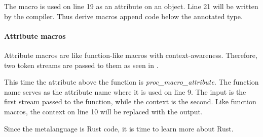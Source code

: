 The macro is used on line 19 as an attribute on an object.
Line 21 will be written by the compiler.
Thus derive macros append code below the annotated type.

\paragraph{Attribute macros}
Attribute macros are like function-like macros with context-awareness.
Therefore, two token streams are passed to them as seen in .


This time the attribute above the function is \textit{proc\_macro\_attribute}.
The function \colorbox{function}{name} serves as the attribute name where it is used on line 9.
The \colorbox{input}{input} is the first stream passed to the function, while the \colorbox{context}{context} is the second.
Like function macros, the \colorbox{context}{context} on line 10 will be replaced with the \colorbox{output}{output}.

Since the metalanguage is Rust code, it is time to learn more about Rust.


